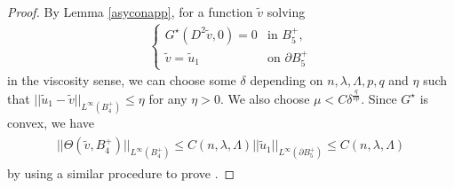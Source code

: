 \documentclass[11pt, reqno]{amsart}
\numberwithin{equation}{section}
\begin{document}
\begin{proof}
By Lemma \ref{asyconapp}, for a function $\tilde{v}$ solving
\begin{align*}
\left\{ \begin{array}{ll}
G^{\star}(D^{2}\tilde{v},0) = 0 & \textrm{in $B_{5}^{+}, $}\\
\tilde{v}=\tilde{u}_{1} & \textrm{on $\partial B_{5}^{+}  $} 
\end{array} \right.
\end{align*}
in the viscosity sense, we can choose some $\delta$ depending on $n, \lambda, \Lambda, p,q$ and $\eta$ such that $||\tilde{u}_{1}-\tilde{v}||_{L^{\infty}(B_{4}^{+})} \le \eta$ for any $\eta>0$.
We also choose  $\mu<C \delta^{\frac{q}{\nu p}}$.
Since $G^{\star}$ is convex, we have 
\begin{align} \label{c2estob} \begin{split}
||\Theta(\tilde{v},B_{4}^{+})||_{L^{\infty}(B_{4}^{+})}\le C(n,\lambda,\Lambda )
||\tilde{u}_{1}||_{L^{\infty}(\partial B_{5}^{+})}
\le C(n,\lambda,\Lambda)
\end{split}
\end{align}
by using a similar procedure to prove \cite[Theorem 4.3]{MR2486925}.


\end{proof}
\end{document}

